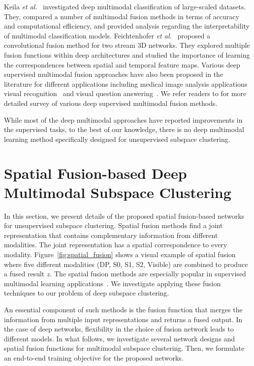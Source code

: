 \documentclass[journal]{IEEEtran}
\newcommand{\etal}{\textit{et al.}}
\begin{document}
Keila \etal~\cite{kiela2018efficient} investigated deep multimodal classification of large-scaled datasets.   They,  compared a number of multimodal fusion methods in terms of accuracy and computational efficiency, and provided analysis regarding the  interpretability of multimodal classification models. Feichtenhofer \etal~\cite{feichtenhofer2016convolutional} proposed a convolutional fusion method for two stream 3D networks.  They explored multiple fusion functions within deep architectures and studied the importance of learning the correspondences between spatial and temporal feature maps.  Various deep supervised multimodal fusion approaches have also been proposed in the literature for different applications including medical image analysis applications~\cite{simonovsky2016deep,liu2015multimodal}   visual recognition~\cite{jain2014modeep,kahou2016emonets} and   visual question answering~\cite{kim2016multimodal,antol2015vqa}. We refer readers to \cite{ramachandram2017deep} for more detailed survey of various  deep supervised multimodal fusion methods.
	
	 



While most of the deep multimodal approaches have reported improvements in the supervised tasks, to the best of our knowledge, there is no deep multimodal learning method specifically designed for unsupervised subspace clustering.	 




\section{Spatial Fusion-based Deep Multimodal Subspace Clustering}\label{sec:method}
In this section, we present details of the proposed spatial fusion-based networks for unsupervised subspace clustering.  Spatial fusion methods find a joint representation that contains complementary information from different modalities.  The joint representation has a spatial correspondence to every modality.  Figure~\ref{fig:spatial_fusion} shows a visual example of spatial fusion where five different modalities (DP, S0, S1, S2, Visible) are combined to produce a fused result $z$.  The spatial fusion methods are especially popular in supervised multimodal learning applications~\cite{kiela2018efficient, feichtenhofer2016convolutional}. We investigate applying these fusion techniques to our problem of deep subspace clustering.		

An essential component of such methods is the fusion function that merges the information from multiple input representations and returns a fused output. In the case of deep networks,  flexibility in the choice of fusion network leads to different models.  In what follows, we investigate several network designs and spatial fusion functions for multimodal subspace clustering. Then, we formulate an end-to-end training objective for the proposed networks.
\end{document}
